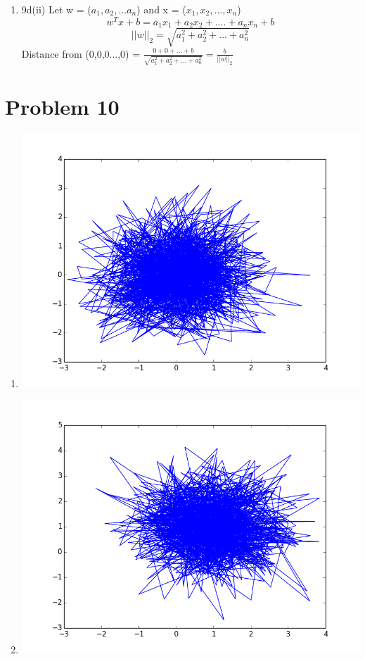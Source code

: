 \documentclass[11pt]{article}
\newcommand{\solution}[1]{{{\color{blue}{\bf Solution:} {#1}}}}
\begin{document}
\begin{enumerate}
\begin{enumerate}
\item 9d(ii) \newline
\solution{}
Let w = ($a_{1}, a_{2}, ... a_{n}$) and x = ($x_{1}, x_{2}, ..., x_{n}$)
$$ w^T x + b = a_{1} x_{1} + a_{2} x_{2} + .... + a_{n} x_{n} + b $$
$$ ||w||_{2} = \sqrt{a_{1}^2 + a_{2}^2 + ... + a_{n}^2}$$
Distance from (0,0,0...,0) = $\frac{0 + 0 + ... + b}{\sqrt{a_{1}^2 + a_{2}^2 + ... + a_{n}^2}} = \frac{b}{||w||_2}$
\end{enumerate}
\end{enumerate}

\newpage
\section{Problem 10}
\begin{enumerate}
\item
\solution{} \newline
\includegraphics[scale=0.5]{10a.png}

\item 
\solution{} \newline
\includegraphics[scale=0.5]{10b.png}


\end{enumerate}
\end{document}
